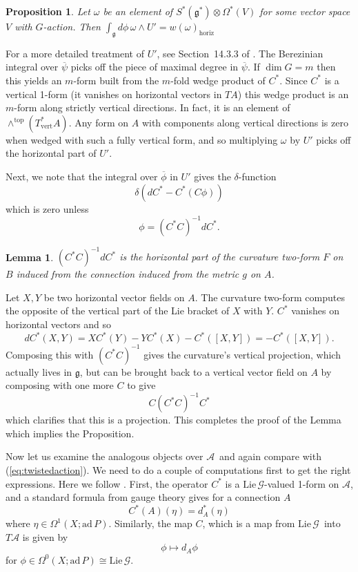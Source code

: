 \documentclass[twoside]{amsart}
\newtheorem{lemma}{Lemma}
\newtheorem{prop}{Proposition}
\renewcommand{\eqref}[1]{(\ref{eq:#1})}
\newcommand{\enm}[1]{\ensuremath{#1}}
\renewcommand{\aa}{\enm{\mathcal{A}}}
\renewcommand{\gg}{\enm{\mathcal{G}}}
\newcommand{\g}{\enm{\mathfrak{g}}}
\renewcommand{\bar}[1]{\overline{#1}}
\newcommand{\ad}{\enm{\mathrm{ad}}}
\newcommand{\formsij}[2]{\ensuremath{\Omega^{#1}({#2})}}
\newcommand{\adp}{\enm{\ad\,P}}
\newcommand{\lieg}{\enm{\mathrm{Lie}\,\gg}}
\begin{document}
\begin{prop}
    Let \( \omega \) be an element of \( S^{*}(\g^{*})\otimes
    \formsij{*}{V} \) for some vector space \( V \) with \( G
    \)-action. Then
    \( \int_{\g} d\phi\, \omega\wedge U' = w(\omega)_{\mathrm{horiz}} \)
\end{prop}
\proof For a more detailed treatment of \( U' \), see Section~14.3.3
of \cite{cordes}.  The Berezinian integral over \( \bar{\psi} \)
picks off the piece of maximal degree in \( \bar{\psi} \).  If \( \dim
G = m \) then this yields an \( m \)-form built from the \( m \)-fold
wedge product of \( C^{*}.  \) Since \( C^{*} \) is a vertical 1-form
(it vanishes on horizontal vectors in \( TA \)) this wedge product is
an \( m \)-form along strictly vertical directions.  In fact, it is an
element of \( \wedge^{\mathrm{top}}(T^{*}_{\mathrm{vert}}A).  \) Any
form on \( A \) with components along vertical directions is zero when
wedged with such a fully vertical form, and so multiplying \( \omega
\) by \( U' \) picks off the horizontal part of \( U' \).

Next, we note that the integral over \( \bar{\phi} \) in \( U' \)
gives
the \( \delta \)-function
\[ \delta(dC^{*}-C^{*}(C\phi)) \]
which is zero unless
\[ \phi = (C^{*}C)^{-1}dC^{*}. \]
\begin{lemma}
    \( (C^{*}C)^{-1}dC^{*} \) is the horizontal part of the curvature
    two-form \( F \) on \( B \) induced from the connection induced
    from the metric \( g \) on \( A \).
\end{lemma}
\proof Let \( X, Y \) be two horizontal vector fields on \( A \).
The curvature two-form computes the opposite of the vertical part
of the Lie bracket of \(
X \) with \( Y \).  \( C^{*} \) vanishes on horizontal vectors and so
\[ dC^{*}(X, Y) = XC^{*}(Y) - YC^{*}(X) - C^{*}([X,Y]) =
-C^{*}([X,Y]). \]
Composing this with \( (C^{*}C)^{-1} \) gives the curvature's vertical
projection, which actually lives in \g, but can be brought back to a
vertical vector field on \( A \) by composing with one more \( C \)
to give
\[ C(C^{*}C)^{-1}C^{*} \]
which clarifies that this is a projection.  This completes the proof
of the Lemma which implies the Proposition.

Now let us examine the analogous objects over \aa\ and again compare
with \eqref{twistedaction}. We need to do a couple of computations
first to get the right expressions.  Here we follow
\cite{atiyahjeffrey}.  First, the operator \( C^* \) is a
\lieg-valued 1-form on \aa, and a standard formula from gauge theory
gives for a connection \( A \)
\[ C^*(A)(\eta) = d_A^*(\eta) \]
where \( \eta\in\formsij{1}{X;\adp}. \) Similarly, the map \( C \),
which is a map from \lieg\ into \( T\aa \) is given by
\[ \phi \mapsto d_A\phi \]
for \( \phi\in\formsij{0}{X;\adp}\cong\lieg \).
\end{document}
